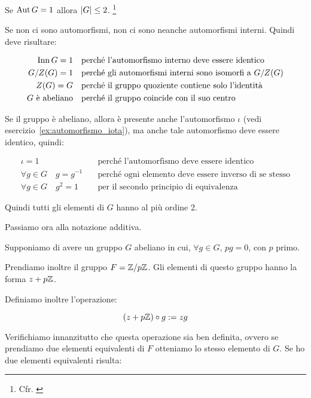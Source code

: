 \begin{esercizio}
	Se $\operatorname{Aut} G = 1$ allora $\lvert G \rvert \le 2$.
	\footnote{Cfr. \cite[pag. 63, es. n. 8]{jacobson}}
\end{esercizio}
\begin{soluzione}
	Se non ci sono automorfismi, non ci sono neanche automorfismi interni. Quindi deve risultare:
	
	\begin{align}
		\operatorname{Inn} G = 1 &\quad\text{perché l'automorfismo interno deve essere identico} \\
		G/Z(G) = 1 &\quad\text{perché gli automorfismi interni sono isomorfi a $G/Z(G)$} \\
		Z(G) = G &\quad\text{perché il gruppo quoziente contiene solo l'identità} \\
		G \text{ è abeliano} &\quad\text{perché il gruppo coincide con il suo centro}
	\end{align}

	Se il gruppo è abeliano, allora è presente anche l'automorfismo $\iota$ (vedi esercizio~\ref{ex:automorfismo_iota}), ma anche tale automorfismo deve essere identico, quindi:
	
	\begin{align}
		\iota = 1 &\quad\text{perché l'automorfismo deve essere identico} \\
		\forall g \in G\quad g = g^{-1} &\quad\text{perché ogni elemento deve essere inverso di se stesso} \\
		\forall g \in G\quad g^2 = 1 &\quad\text{per il secondo principio di equivalenza}
	\end{align}

	Quindi tutti gli elementi di $G$ hanno al più ordine 2.

	Passiamo ora alla notazione additiva. 
	
	Supponiamo di avere un gruppo $G$ abeliano in cui, $\forall g \in G$, $pg = 0$, con $p$ primo.
	
	Prendiamo inoltre il gruppo $F = \mathbb{Z}/p\mathbb{Z}$. Gli elementi di questo gruppo hanno la forma $z + p\mathbb{Z}$.
	
	Definiamo inoltre l'operazione:
	
	\begin{equation}
		(z + p\mathbb{Z}) \circ g := zg
	\end{equation}

	Verifichiamo innanzitutto che questa operazione sia ben definita, ovvero se prendiamo due elementi equivalenti di $F$ otteniamo lo stesso elemento di $G$. Se ho due elementi equivalenti risulta:
	

\end{soluzione}
